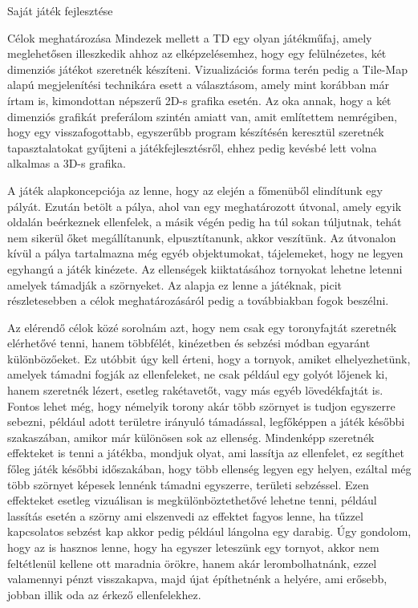 \begin{MyChapter}{Saját játék fejlesztése}
\begin{MySection}{Célok meghatározása}
		Mindezek mellett a TD egy olyan játékműfaj, amely meglehetősen illeszkedik ahhoz az elképzelésemhez, hogy egy felülnézetes, két dimenziós játékot szeretnék készíteni. Vizualizációs forma terén pedig a Tile-Map alapú megjelenítési technikára esett a választásom, amely mint korábban már írtam is, kimondottan népszerű 2D-s grafika esetén. Az oka annak, hogy a két dimenziós grafikát preferálom szintén amiatt van, amit említettem nemrégiben, hogy egy visszafogottabb, egyszerűbb program készítésén keresztül szeretnék tapasztalatokat gyűjteni a játékfejlesztésről, ehhez pedig kevésbé lett volna alkalmas a 3D-s grafika.
		
		A játék alapkoncepciója az lenne, hogy az elején a főmenüből elindítunk egy pályát. Ezután betölt a pálya, ahol van egy meghatározott útvonal, amely egyik oldalán beérkeznek ellenfelek, a másik végén pedig ha túl sokan túljutnak, tehát nem sikerül őket megállítanunk, elpusztítanunk, akkor veszítünk. Az útvonalon kívül a pálya tartalmazna még egyéb objektumokat, tájelemeket, hogy ne legyen egyhangú a játék kinézete. Az ellenségek kiiktatásához tornyokat lehetne letenni amelyek támadják a szörnyeket. Az alapja ez lenne a játéknak, picit részletesebben a célok meghatározásáról pedig a továbbiakban fogok beszélni.
		
		Az elérendő célok közé sorolnám azt, hogy nem csak egy toronyfajtát szeretnék elérhetővé tenni, hanem többfélét, kinézetben és sebzési módban egyaránt különbözőeket. Ez utóbbit úgy kell érteni, hogy a tornyok, amiket elhelyezhetünk, amelyek támadni fogják az ellenfeleket, ne csak például egy golyót lőjenek ki, hanem szeretnék lézert, esetleg rakétavetőt, vagy más egyéb lövedékfajtát is. Fontos lehet még, hogy némelyik torony akár több szörnyet is tudjon egyszerre sebezni, például adott területre irányuló támadással, legfőképpen a játék későbbi szakaszában, amikor már különösen sok az ellenség. Mindenképp szeretnék effekteket is tenni a játékba, mondjuk olyat, ami lassítja az ellenfelet, ez segíthet főleg játék későbbi időszakában, hogy több ellenség legyen egy helyen, ezáltal még több szörnyet képesek lennénk támadni egyszerre, területi sebzéssel. Ezen effekteket esetleg vizuálisan is megkülönböztethetővé lehetne tenni, például lassítás esetén a szörny ami elszenvedi az effektet fagyos lenne, ha tűzzel kapcsolatos sebzést kap akkor pedig például lángolna egy darabig.
		Úgy gondolom, hogy az is hasznos lenne, hogy ha egyszer leteszünk egy tornyot, akkor nem feltétlenül kellene ott maradnia örökre, hanem akár lerombolhatnánk, ezzel valamennyi pénzt visszakapva, majd újat építhetnénk a helyére, ami erősebb, jobban illik oda az érkező ellenfelekhez. 
		

\end{MySection}
\end{MyChapter}
